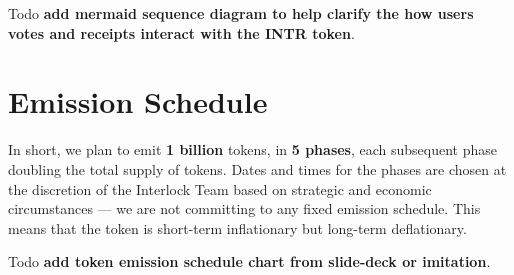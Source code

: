 \documentclass[a4paper]{article}
\begin{document}
Todo \textbf{add mermaid sequence diagram to help clarify the how users votes and receipts interact with the INTR token}.
\section{Emission Schedule}
\label{Emission Schedule}

In short, we plan to emit \textbf{1 billion} tokens, in \textbf{5 phases}, each subsequent phase doubling the total supply of tokens. Dates and times for the phases are chosen at the discretion of the Interlock Team based on strategic and economic circumstances ---  we are not committing to any fixed emission schedule. This means that the token is short-term inflationary but long-term deflationary.

Todo \textbf{add token emission schedule chart from slide-deck or imitation}.
\end{document}
